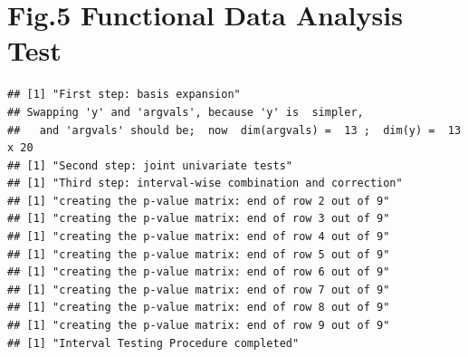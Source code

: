 \documentclass[]{article}
\newenvironment{Shaded}{\begin{snugshade}}{\end{snugshade}}
\newcommand{\KeywordTok}[1]{\textcolor[rgb]{0.13,0.29,0.53}{\textbf{#1}}}
\newcommand{\DataTypeTok}[1]{\textcolor[rgb]{0.13,0.29,0.53}{#1}}
\newcommand{\StringTok}[1]{\textcolor[rgb]{0.31,0.60,0.02}{#1}}
\newcommand{\OperatorTok}[1]{\textcolor[rgb]{0.81,0.36,0.00}{\textbf{#1}}}
\newcommand{\NormalTok}[1]{#1}
\begin{document}
\section{Fig.5 Functional Data Analysis
Test}\label{fig.5-functional-data-analysis-test}

\begin{Shaded}
\end{Shaded}

\begin{verbatim}
## [1] "First step: basis expansion"
## Swapping 'y' and 'argvals', because 'y' is  simpler,
##   and 'argvals' should be;  now  dim(argvals) =  13 ;  dim(y) =  13 x 20 
## [1] "Second step: joint univariate tests"
## [1] "Third step: interval-wise combination and correction"
## [1] "creating the p-value matrix: end of row 2 out of 9"
## [1] "creating the p-value matrix: end of row 3 out of 9"
## [1] "creating the p-value matrix: end of row 4 out of 9"
## [1] "creating the p-value matrix: end of row 5 out of 9"
## [1] "creating the p-value matrix: end of row 6 out of 9"
## [1] "creating the p-value matrix: end of row 7 out of 9"
## [1] "creating the p-value matrix: end of row 8 out of 9"
## [1] "creating the p-value matrix: end of row 9 out of 9"
## [1] "Interval Testing Procedure completed"
\end{verbatim}
\end{document}
